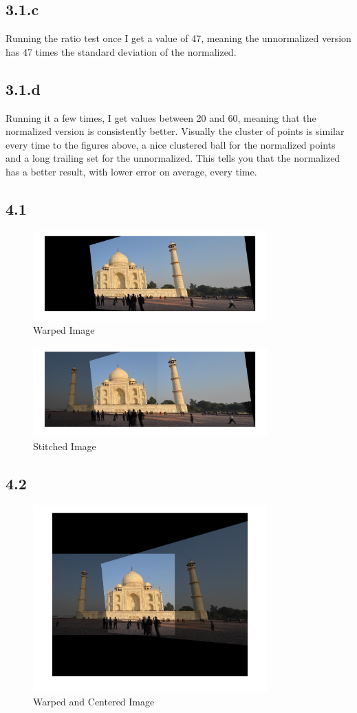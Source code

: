 \documentclass[11pt]{article}
\begin{document}
\subsection*{3.1.c}
Running the ratio test once I get a value of 47, meaning the unnormalized version has 47 times the standard deviation of the normalized. \\
\subsection*{3.1.d}
Running it a few times, I get values between 20 and 60, meaning that the normalized version is consistently better. Visually the cluster of points is similar every time to the figures above, a nice clustered ball for the normalized points and a long trailing set for the unnormalized. This tells you that the normalized has a better result, with lower error on average, every time. 
\subsection*{4.1}
\begin{figure}[H]
\centering
\includegraphics[width=90mm]{results/q4_1.jpg}
\caption{Warped Image }
\end{figure}
\begin{figure}[H]
\centering
\includegraphics[width=90mm]{results/q4_1_pan.jpg}
\caption{Stitched Image }
\end{figure}
\subsection*{4.2}
\begin{figure}[H]
\centering
\includegraphics[width=90mm]{results/q4_2_pan.jpg}
\caption{Warped and Centered Image}
\end{figure}
\end{document}
